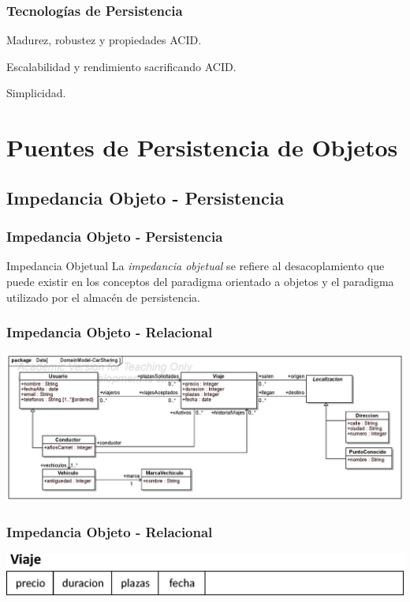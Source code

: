 \documentclass[a4paper,slidestop,xcolor=pst,blue]{beamer}
\begin{document}
\begin{frame}[c]
    \frametitle{Tecnologías de Persistencia}
    \begin{description}[<+->]
        \item[Relacional] Madurez, robustez y propiedades ACID.
        \item[NoSQL] Escalabilidad y rendimiento sacrificando ACID.
        \item[XML/JSON] Simplicidad.
    \end{description}
\end{frame}

\section{Puentes de Persistencia de Objetos}

\subsection{Impedancia Objeto - Persistencia}

\begin{frame}[c]
    \frametitle{Impedancia Objeto - Persistencia}
    \begin{block}{Impedancia Objetual}
    La \emph{impedancia objetual} se refiere al desacoplamiento que puede existir en los conceptos del paradigma orientado a objetos y el paradigma utilizado por el almacén de persistencia.
    \end{block}
\end{frame}

\begin{frame}[c]
    \frametitle{Impedancia Objeto - Relacional}
    \begin{center}
        \includegraphics[width=\linewidth]{images/ooMismatch/ooMismatch00.eps}
    \end{center}
\end{frame}

\begin{frame}[c]
    \frametitle{Impedancia Objeto - Relacional}
    \begin{center}
        \includegraphics[width=0.8\linewidth]{images/ooMismatch/ooMismatch01.eps}
    \end{center}
\end{frame}
\end{document}
